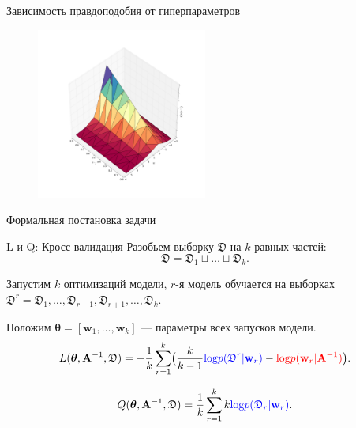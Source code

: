 \documentclass[11pt,pdf,utf8,russian,aspectratio=169]{beamer}
\begin{document}
\begin{frame}{Зависимость правдоподобия от гиперпараметров}
           
\begin{figure}[h]                                                                                                                               
\centering  
   \includegraphics[width=0.5\textwidth]{./slide_plots/hyper.png}
\end{figure}
\end{frame}


\begin{frame}{Формальная постановка задачи}


\end{frame}


\begin{frame}{L и Q: Кросс-валидация}
Разобьем выборку $\mathfrak{D}$ на $k$ равных частей:
\[
\mathfrak{D} = \mathfrak{D}_1 \sqcup \dots \sqcup \mathfrak{D}_k.
\]

Запустим $k$ оптимизаций модели, $r$-я модель обучается на выборках $\mathfrak{D}^r = \mathfrak{D}_1,\dots,\mathfrak{D}_{r-1},\mathfrak{D}_{r+1},\dots,\mathfrak{D}_k$.

Положим $\boldsymbol{\theta} = [\mathbf{w}_1, \dots, \mathbf{w}_k]$ --- параметры всех запусков модели.
\[
L(\boldsymbol{\theta}, \mathbf{A}^{-1}, \mathfrak{D}) = -\frac{1}{k}\sum_{r=1}^k \bigl(\frac{k}{k-1}\textcolor{blue}{\text{log}p(\mathfrak{D}^r|\mathbf{w}_r)} - \textcolor{red}{\text{log}p(\mathbf{w}_r|\mathbf{A}^{-1})}\bigr).
\]

\[
Q(\boldsymbol{\theta}, \mathbf{A}^{-1}, \mathfrak{D}) = \frac{1}{k}\sum_{r=1}^k k\textcolor{blue}{\text{log}p(\mathfrak{D}_r|\mathbf{w}_r)}.
\]


\end{frame}
\end{document}
